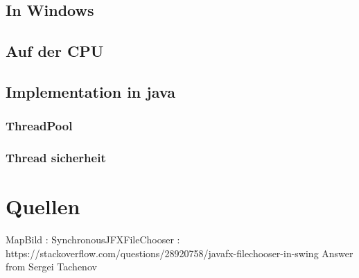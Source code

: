 \documentclass[a4paper,13pt]{scrartcl}
\begin{document}
\subsection{In Windows}
\subsection{Auf der CPU}
\subsection{Implementation in java}
\subsubsection{ThreadPool}
\subsubsection{Thread sicherheit}

\section{Quellen}
MapBild : 
SynchronousJFXFileChooser : https://stackoverflow.com/questions/28920758/javafx-filechooser-in-swing
Answer from Sergei Tachenov
\end{document}
